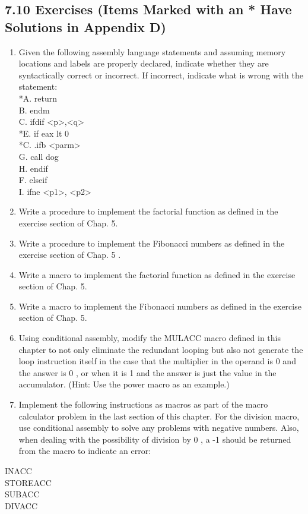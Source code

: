 \documentclass[10pt]{article}
\begin{document}
\subsection*{7.10 Exercises (Items Marked with an * Have Solutions in Appendix D)}
\begin{enumerate}
  \item Given the following assembly language statements and assuming memory locations and labels are properly declared, indicate whether they are syntactically correct or incorrect. If incorrect, indicate what is wrong with the statement:\\
*A. return\\
B. endm\\
C. ifdif <p>,<q>\\
*E. if eax lt 0\\
*C. .ifb <parm>\\
G. call dog\\
H. endif\\
F. elseif\\
I. ifne <p1>, <p2>
  \item Write a procedure to implement the factorial function as defined in the exercise section of Chap. 5.
  \item Write a procedure to implement the Fibonacci numbers as defined in the exercise section of Chap. 5 .
  \item Write a macro to implement the factorial function as defined in the exercise section of Chap. 5.
  \item Write a macro to implement the Fibonacci numbers as defined in the exercise section of Chap. 5.
  \item Using conditional assembly, modify the MULACC macro defined in this chapter to not only eliminate the redundant looping but also not generate the loop instruction itself in the case that the multiplier in the operand is 0 and the answer is 0 , or when it is 1 and the answer is just the value in the accumulator. (Hint: Use the power macro as an example.)
  \item Implement the following instructions as macros as part of the macro calculator problem in the last section of this chapter. For the division macro, use conditional assembly to solve any problems with negative numbers. Also, when dealing with the possibility of division by 0 , a -1 should be returned from the macro to indicate an error:
\end{enumerate}

INACC\\
STOREACC\\
SUBACC\\
DIVACC
\end{document}

